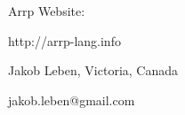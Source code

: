 \documentclass{beamer}
\begin{document}
\begin{frame}[fragile]

\centering

\vspace{15pt}

Arrp Website:

http://arrp-lang.info

\vspace{30pt}

Jakob Leben, Victoria, Canada

jakob.leben@gmail.com

\end{frame}
\end{document}
